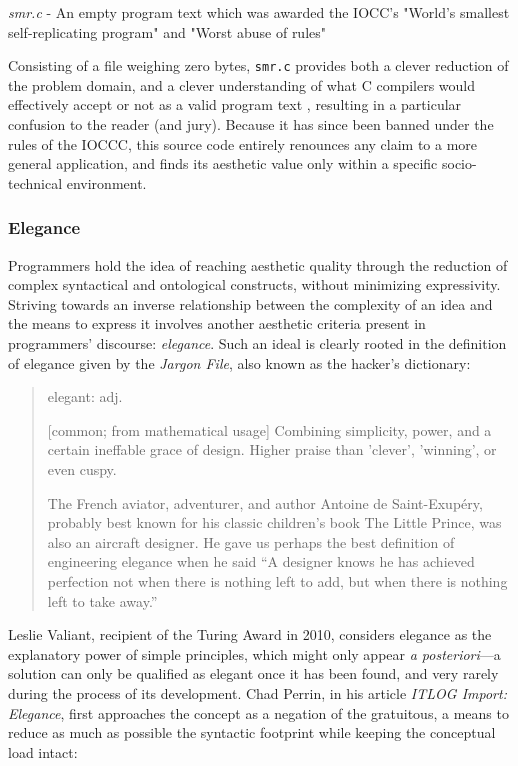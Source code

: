 \begin{listing}
  \inputminted{c}{./corpus/smr.c}
  \caption{\emph{smr.c} - An empty program text which was awarded the IOCC's "World's smallest self-replicating program" and "Worst abuse of rules" \citep{rusinkiewicz_smr_1970}}
  \label{code:smr_c}
\end{listing}

Consisting of a file weighing zero bytes, \lstinline{smr.c} provides both a clever reduction of the problem domain, and a clever understanding of what C compilers would effectively accept or not as a valid program text \citep{kanakarakis_international_2022}, resulting in a particular confusion to the reader (and jury). Because it has since been banned under the rules of the IOCCC, this source code entirely renounces any claim to a more general application, and finds its aesthetic value only within a specific socio-technical environment.

\subsubsection{Elegance}
\label{subsubsec:elegance}

Programmers hold the idea of reaching aesthetic quality through the reduction of complex syntactical and ontological constructs, without minimizing expressivity. Striving towards an inverse relationship between the complexity of an idea and the means to express it involves another aesthetic criteria present in programmers' discourse: \emph{elegance}. Such an ideal is clearly rooted in the definition of elegance given by the \emph{Jargon File}, also known as the hacker's dictionary:

\begin{quote}
  elegant: adj.

    [common; from mathematical usage] Combining simplicity, power, and a certain ineffable grace of design. Higher praise than 'clever', 'winning', or even cuspy.

    The French aviator, adventurer, and author Antoine de Saint-Exupéry, probably best known for his classic children's book The Little Prince, was also an aircraft designer. He gave us perhaps the best definition of engineering elegance when he said “A designer knows he has achieved perfection not when there is nothing left to add, but when there is nothing left to take away.” \citep{jargonfile4.4.7_elegant_2003}
\end{quote}

Leslie Valiant, recipient of the Turing Award in 2010, considers elegance as the explanatory power of simple principles, which might only appear \emph{a posteriori}—a solution can only be qualified as elegant once it has been found, and very rarely during the process of its development\citep{anthes_beauty_2011}. Chad Perrin, in his article \emph{ITLOG Import: Elegance}, first approaches the concept as a negation of the gratuitous, a means to reduce as much as possible the syntactic footprint while keeping the conceptual load intact:

